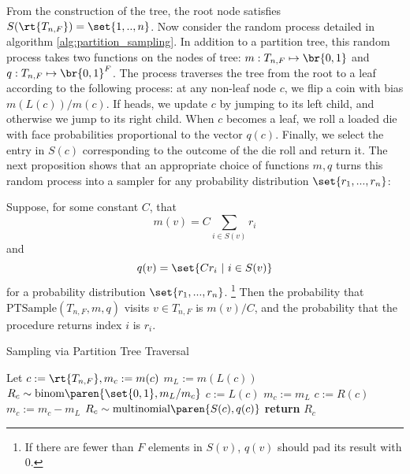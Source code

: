 From the construction of the tree, the root node satisfies $S(\rt{T_{n, F}}) = \set{1, .., n}$. 
Now consider the random process detailed in algorithm \ref{alg:partition_sampling}. In addition to 
a partition tree, this random process takes two functions on the nodes of tree: 
$m: T_{n, F} \mapsto \br{0, 1}$ and $q: T_{n, F} \mapsto 
\br{0, 1}^F$. The process traverses the tree from the
root to a leaf according to the following process: at any non-leaf node $c$, we flip a coin 
with bias $m(L(c)) / m(c)$. If heads, we update $c$ by jumping to its left child, 
and otherwise we jump to its right child. When 
$c$ becomes a leaf, we roll a loaded die with face probabilities proportional to the
vector $q(c)$. Finally, we select the entry in $S(c)$ corresponding to the outcome of the die roll
and return it. The next proposition shows that an appropriate choice of functions $m, q$ turns this random process into a sampler for 
any probability distribution $\set{r_1, ..., r_n}$:

\begin{proposition}
Suppose, for some constant $C$, that 
$$m(v) = C \sum_{i \in S(v)} r_i$$ 
and
$$q(v) = \set{C r_i\ \vert\ i \in S(v)}$$
for a probability distribution $\set{r_1, ..., r_n}$. \footnote{If there
are fewer than $F$ elements in $S(v)$, $q(v)$ should pad its result with 0.} Then the probability that $\textrm{PTSample}(T_{n, F}, m, q)$ visits 
$v \in T_{n, F}$ is $m(v) / C$, and the probability that the
procedure returns index $i$ is $r_i$.
\label{prop:ptsample_correctness}
\end{proposition}

\begin{algorithm}
    \caption{Sampling via Partition Tree Traversal}
    \label{alg:partition_sampling}
    \begin{algorithmic}[1]
    \State Let $c := \rt{T_{n,F}}, m_c := m(c)$
        \State $m_L := m(L(c))$
        \State $R_c \sim \textrm{binom} \paren{\set{0, 1}, m_L / m_c}$
            \State $c := L(c)$
            \State $m_c := m_L$
        \Else 
            \State $c := R(c)$
            \State $m_c := m_c - m_L$
        \EndIf
    \EndWhile
    \State $R_c \sim \textrm{multinomial} \paren{S(c), q(c)}$ 
    \State \textbf{return} $R_c$  
    \EndProcedure
    \end{algorithmic}
\end{algorithm}

